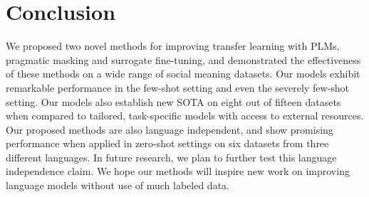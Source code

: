 \section{Conclusion}\label{sec:conclude} 
We proposed two novel methods for improving transfer learning with PLMs, pragmatic masking and surrogate fine-tuning, and demonstrated the effectiveness of these methods on a wide range of social meaning datasets. 
Our models exhibit remarkable performance in the few-shot setting and even the severely few-shot setting. Our models also establish new SOTA on eight out of fifteen datasets when compared to tailored, task-specific models with access to external resources. Our proposed methods are also language independent, and show promising performance when applied in zero-shot settings on six datasets from three different languages. In future research, we plan to further test this language independence claim. We hope our methods will inspire new work on improving language models without use of much labeled data.%
